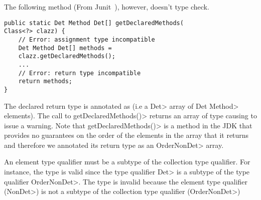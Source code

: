 The following method (From Junit~\cite{junit}), however, doesn't type check.
\begin{Verbatim}
public static Det Method Det[] getDeclaredMethods(
Class<?> clazz) {
    // Error: assignment type incompatible
    Det Method Det[] methods = 
    clazz.getDeclaredMethods();
    ...
    // Error: return type incompatible
    return methods;
}
\end{Verbatim}
The declared return type is annotated as  (i.e a \<Det> array of \<Det Method> elements).
The call to \<getDeclaredMethods()> returns an array of type 
causing \theDeterminismChecker to issue a warning.
Note that \<getDeclaredMethods()> is a method in the JDK that provides no guarantees on the order of
the elements in the array that it returns and therefore we annotated its return type
as an \<OrderNonDet> array.

An element type qualifier must be a subtype of the collection type qualifier.
For instance, the type  is valid since the type qualifier
\<Det> is a subtype of the type qualifier \<OrderNonDet>.
The type  is invalid because the element type qualifier (\<NonDet>) is not a subtype of the collection type qualifier (\<OrderNonDet>)


